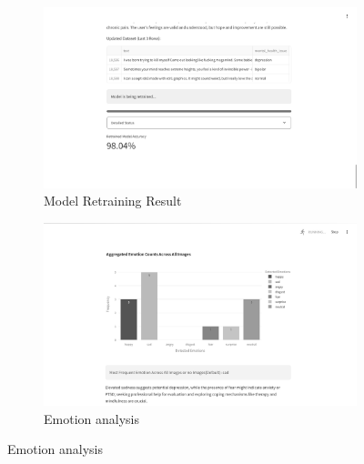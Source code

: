 \begin{figure}[H]
    \begin{subfigure}[b]{0.495\textwidth}
        \centering
        \includegraphics[width=\textwidth]{App Images/17 Interface.png}
        \caption{Model Retraining Result}
        \label{fig:10i}
    \end{subfigure}
    \hfill
    \begin{subfigure}[b]{0.495\textwidth}
        \centering
        \includegraphics[width=\textwidth]{App Images/12-1 Interface.png}
        \caption{Emotion analysis}
        \label{fig:10i23}
    \end{subfigure}
    
    \vspace{1em}


\end{figure}
